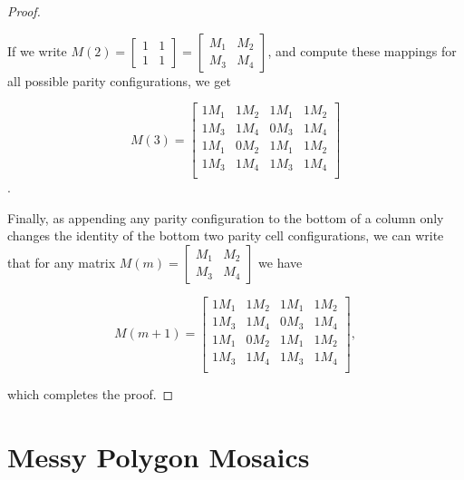 \documentclass[12pt]{article}
\theoremstyle{plain}
\theoremstyle{definition}
\theoremstyle{remark}
\theoremstyle{definition}
\newcommand{\lablnode}[3]{\node[shape=circle,draw=none,fill=none, inner sep=0pt,minimum size=0pt] (A) at ( #1 , #2 ) {#3};}
\begin{document}
\begin{proof}
\begin{center}
\end{center}

If we write $M(2) = \begin{bmatrix}
    1 & 1 \\
    1 & 1 
\end{bmatrix} = 
\begin{bmatrix}
    M_1 & M_2 \\
    M_3 & M_4 
\end{bmatrix}
$, and compute these mappings for all possible parity configurations, we get

$$
M(3) = 
\begin{bmatrix}
    1M_1 & 1M_2 & 1M_1 & 1M_2 \\
    1M_3 & 1M_4 & 0M_3 & 1M_4 \\
    1M_1 & 0M_2 & 1M_1 & 1M_2 \\
    1M_3 & 1M_4 & 1M_3 & 1M_4 \\
\end{bmatrix}
$$.

Finally, as appending any parity configuration to the bottom of a column only changes the identity of the bottom two parity cell configurations, we can write that for any matrix $M(m) =\begin{bmatrix} M_1 & M_2 \\ M_3 & M_4 \end{bmatrix}$ we have 

$$
M(m+1) = 
\begin{bmatrix}
    1M_1 & 1M_2 & 1M_1 & 1M_2 \\
    1M_3 & 1M_4 & 0M_3 & 1M_4 \\
    1M_1 & 0M_2 & 1M_1 & 1M_2 \\
    1M_3 & 1M_4 & 1M_3 & 1M_4 \\
\end{bmatrix},
$$

which completes the proof.

\end{proof}

\section{Messy Polygon Mosaics}
\end{document}
